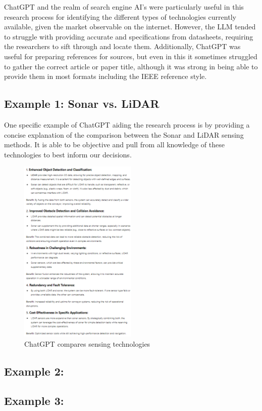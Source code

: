 \noindent ChatGPT and the realm of search engine AI's were particularly useful in this research process for identifying the different types of technologies currently available, given the market observable on the internet. However, the LLM tended to struggle with providing accurate and specifications from datasheets, requiring the researchers to sift through and locate them. Additionally, ChatGPT was useful for preparing references for sources, but even in this it sometimes struggled to gather the correct article or paper title, although it was strong in being able to provide them in most formats including the IEEE reference style.\\

\subsection{Example 1: Sonar vs. LiDAR}
\noindent One specific example of ChatGPT aiding the research process is by providing a concise explanation of the comparison between the Sonar and LiDAR sensing methods. It is able to be objective and pull from all knowledge of these technologies to best inform our decisions.\\
\begin{figure}[H]
	\centering
	\includegraphics[width=0.5\textwidth]{./Images/chatgpt1.png}
	\caption{\label{fig:chatgpt1}ChatGPT compares sensing technologies}
\end{figure}


\subsection{Example 2: }

\subsection{Example 3: }